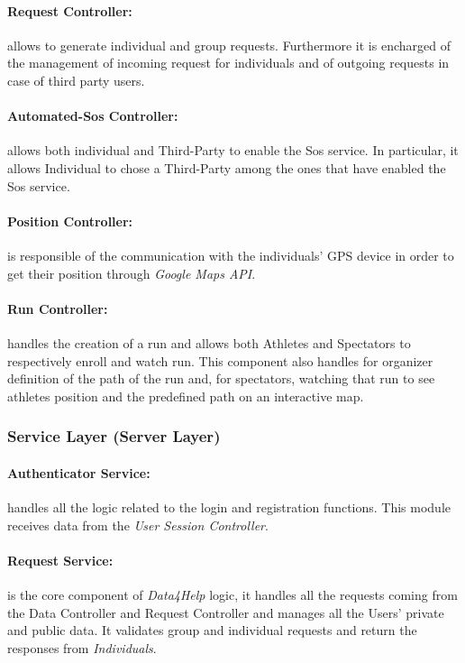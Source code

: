 \documentclass[a4paper]{article}
\begin{document}
    \paragraph{Request Controller:}
    allows to generate individual and group requests. Furthermore it is encharged of the management of incoming request for individuals and of outgoing requests in case of third party users.
    
    \paragraph{Automated-Sos Controller:}
    allows both individual and Third-Party to enable the Sos service. In particular, it allows Individual to chose a Third-Party among the ones that have enabled the Sos service.
    
    \paragraph{Position Controller:}
    is responsible of the communication with the individuals' GPS device in order to get their position through \textit{Google Maps API}.

    \paragraph{Run Controller:}
    handles the creation of a run and allows both Athletes and Spectators to respectively enroll and watch run. This component also handles for organizer definition of the path of the run and, for spectators, watching that run to see athletes position and the predefined path on an interactive map.
    
    \subsubsection{Service Layer (Server Layer)}

    \paragraph{Authenticator Service:}
    handles all the logic related to the login and registration functions. This module receives data from the \textit{User Session Controller}.

    \paragraph{Request Service:}
    is the core component of \textit{Data4Help} logic, it handles all the requests coming from the Data Controller and Request Controller and manages all the Users' private and public data. It validates group and individual requests and return the responses from \textit{Individuals}.
    
\end{document}
